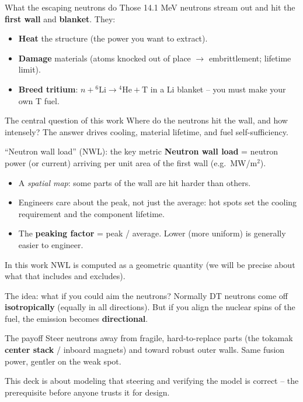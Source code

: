 \documentclass[aspectratio=169]{beamer}
\newcommand{\keyword}[1]{\textcolor{blue!60!black}{\textbf{#1}}}
\begin{document}
\begin{frame}{What the escaping neutrons do}
  Those 14.1 MeV neutrons stream out and hit the \keyword{first wall} and \keyword{blanket}. They:
  \begin{itemize}
    \item \keyword{Heat} the structure (the power you want to extract).
    \item \keyword{Damage} materials (atoms knocked out of place $\to$ embrittlement; lifetime limit).
    \item \keyword{Breed tritium}: $n + {}^6\mathrm{Li}\to {}^4\mathrm{He}+\mathrm{T}$ in a Li blanket -- you must make your own T fuel.
  \end{itemize}
  \vfill
  \begin{block}{The central question of this work}
    \alert{Where do the neutrons hit the wall, and how intensely?} The answer drives cooling, material lifetime, and fuel self-sufficiency.
  \end{block}
\end{frame}

\begin{frame}{``Neutron wall load'' (NWL): the key metric}
  \keyword{Neutron wall load} = neutron power (or current) arriving \alert{per unit area} of the first wall (e.g.\ MW/m$^2$).
  \begin{itemize}
    \item A \emph{spatial map}: some parts of the wall are hit harder than others.
    \item Engineers care about the \alert{peak}, not just the average: hot spots set the cooling requirement and the component lifetime.
    \item The \keyword{peaking factor} = peak / average. Lower (more uniform) is generally easier to engineer.
  \end{itemize}
  \vfill
  \footnotesize In this work NWL is computed as a \alert{geometric} quantity (we will be precise about what that includes and excludes).
\end{frame}

\begin{frame}{The idea: what if you could aim the neutrons?}
  Normally DT neutrons come off \keyword{isotropically} (equally in all directions). But if you \alert{align the nuclear spins} of the fuel, the emission becomes \keyword{directional}.
  \vfill
  \begin{block}{The payoff}
    \alert{Steer neutrons away from fragile, hard-to-replace parts} (the tokamak \keyword{center stack} / inboard magnets) and \alert{toward robust outer walls}. Same fusion power, gentler on the weak spot.
  \end{block}
  \vfill
  This deck is about \alert{modeling that steering} and \alert{verifying the model is correct} -- the prerequisite before anyone trusts it for design.
\end{frame}
\end{document}
